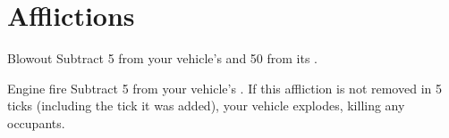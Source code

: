 
\section{Afflictions}

\begin{describe}{Blowout}
  Subtract 5 from your vehicle's  and 50 from its .
\end{describe}

\begin{describe}{Engine fire}
  Subtract 5 from your vehicle's . If this affliction is not removed in 5 ticks (including the tick it was added), your vehicle explodes, killing any occupants.
\end{describe}
